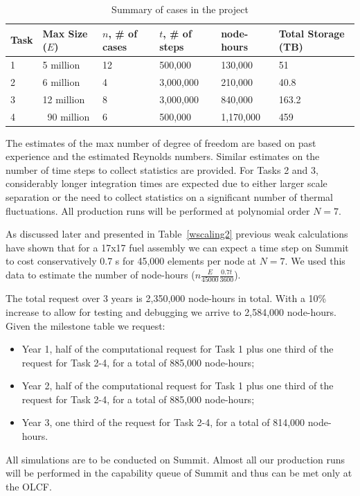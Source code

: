 \begin{table}
\centering
\caption{Summary of cases in the project}
\begin{tabular}{llllll}
\hline
\hline
Task & Max Size ($E$) &  $n$, \# of cases  & $t$, \# of steps & node-hours & Total Storage (TB)\\
\hline
\hline
1 & 5 million       & 12   & 500,000   &    130,000 & 51\\
2 & 6 million       & 4    & 3,000,000 &    210,000 & 40.8\\
3 & 12 million      & 8    & 3,000,000 &    840,000 & 163.2\\
4 & ~90 million  & 6    & 500,000   &  1,170,000 & 459\\
\hline
\hline
\end{tabular}
\label{tab:cases}
\end{table}

The estimates of the max number of degree of freedom are based  on past
experience and the estimated Reynolds numbers. Similar estimates on the number
of time steps to collect statistics are provided. For Tasks 2 and 3,
considerably longer integration times are expected due to either larger scale
separation or the need to collect statistics on a significant number of thermal
fluctuations. All production runs will be performed at polynomial order $N=7$.

As discussed later and presented in Table~\ref{wscaling2} previous weak
calculations have shown that for a 17x17 fuel assembly we can expect a time
step on Summit to cost conservatively 0.7 s for 45,000 elements per node at $N=7$. We
used this data to estimate the number of node-hours
($n\frac{E}{45000}\frac{0.7t}{3600}$).

The total request over 3 years is 2,350,000 node-hours in total. With a 10\% increase to allow for testing and debugging we arrive to 2,584,000 node-hours. Given the milestone table we request:
\begin{itemize}
    \item Year 1, half of the computational request for Task 1 plus one third of the request for Task 2-4, for a total of 885,000 node-hours;
    \item Year 2, half of the computational request for Task 1 plus one third of the request for Task 2-4, for a total of 885,000 node-hours;
    \item Year 3, one third of the request for Task 2-4, for a total of 814,000 node-hours.
\end{itemize}
All simulations are to be conducted on Summit. Almost all our production runs will be performed in the capability queue of Summit and thus can be met only at the OLCF.

